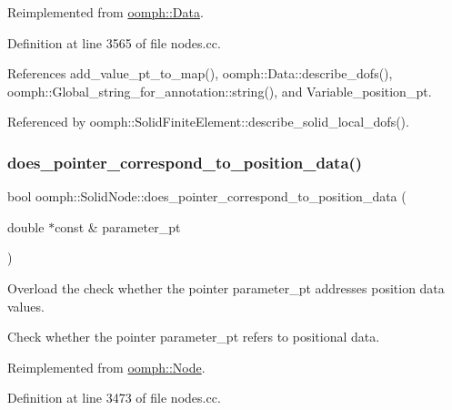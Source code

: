 Reimplemented from \hyperlink{classoomph_1_1Data_a2dae16e2dcff9a40029f834c83364df5}{oomph\+::\+Data}.



Definition at line 3565 of file nodes.\+cc.



References add\+\_\+value\+\_\+pt\+\_\+to\+\_\+map(), oomph\+::\+Data\+::describe\+\_\+dofs(), oomph\+::\+Global\+\_\+string\+\_\+for\+\_\+annotation\+::string(), and Variable\+\_\+position\+\_\+pt.



Referenced by oomph\+::\+Solid\+Finite\+Element\+::describe\+\_\+solid\+\_\+local\+\_\+dofs().

\mbox{\label{classoomph_1_1SolidNode_a33be0ea0fc6c0575d20f303b19a7d4b5}} 
\subsubsection{\texorpdfstring{does\+\_\+pointer\+\_\+correspond\+\_\+to\+\_\+position\+\_\+data()}{does\_pointer\_correspond\_to\_position\_data()}}
{\footnotesize\ttfamily bool oomph\+::\+Solid\+Node\+::does\+\_\+pointer\+\_\+correspond\+\_\+to\+\_\+position\+\_\+data (\begin{DoxyParamCaption}\item[{double $\ast$const \&}]{parameter\+\_\+pt }\end{DoxyParamCaption})\hspace{0.3cm}{\ttfamily [virtual]}}



Overload the check whether the pointer parameter\+\_\+pt addresses position data values. 

Check whether the pointer parameter\+\_\+pt refers to positional data. 

Reimplemented from \hyperlink{classoomph_1_1Node_ab5d4bea7ffc69a82fde5720a2a6d784c}{oomph\+::\+Node}.



Definition at line 3473 of file nodes.\+cc.



